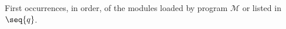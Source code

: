 First occurrences, in order, of the modules loaded by program $\mathcal{M}$ or listed in $\seq{q}$.
